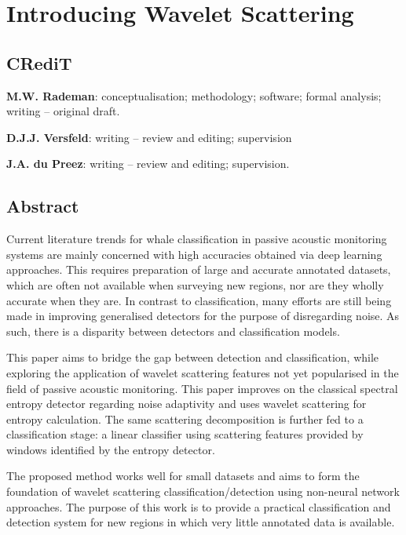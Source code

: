 \chapter{Introducing Wavelet Scattering}
\label{chap:p2}



\section*{CRediT}
\textbf{M.W. Rademan}: conceptualisation; methodology; software; formal analysis; writing -- original draft.

\textbf{D.J.J. Versfeld}: writing -- review and editing; supervision

\textbf{J.A. du Preez}: writing -- review and editing; supervision.

\section*{Abstract}
Current literature trends for whale classification in passive acoustic monitoring systems are mainly concerned with high accuracies obtained via deep learning approaches. This requires preparation of large and accurate annotated datasets, which are often not available when surveying new regions, nor are they wholly accurate when they are. In contrast to classification, many efforts are still being made in improving generalised detectors for the purpose of disregarding noise. As such, there is a disparity between detectors and classification models. 

This paper aims to bridge the gap between detection and classification, while exploring the application of wavelet scattering features not yet popularised in the field of passive acoustic monitoring. This paper improves on the classical spectral entropy detector regarding noise adaptivity and uses wavelet scattering for entropy calculation. The same scattering decomposition is further fed to a classification stage: a linear classifier using scattering features provided by windows identified by the entropy detector.

The proposed method works well for small datasets and aims to form the foundation of wavelet scattering classification/detection using non-neural network approaches. The purpose of this work is to provide a practical classification and detection system for new regions in which very little annotated data is available.  


